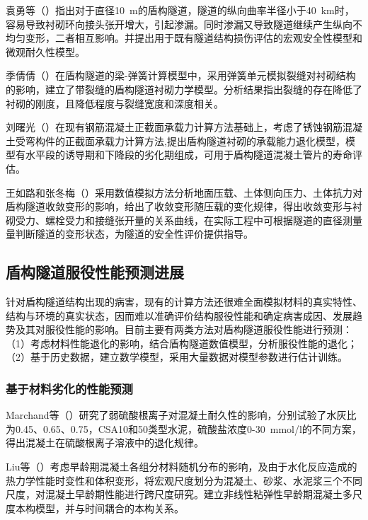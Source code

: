 袁勇等（\citeyear{袁勇2006运营越江隧道服役现状调查与检测评估}）指出对于直径10~m的盾构隧道，隧道的纵向曲率半径小于40~km时，容易导致衬砌环向接头张开增大，引起渗漏。同时渗漏又导致隧道继续产生纵向不均匀变形，二者相互影响。并提出用于既有隧道结构损伤评估的宏观安全性模型和微观耐久性模型。

季倩倩（\citeyear{季倩倩2009带裂缝的盾构隧道衬砌力学模型研究}）在盾构隧道的梁-弹簧计算模型中，采用弹簧单元模拟裂缝对衬砌结构的影响，建立了带裂缝的盾构隧道衬砌力学模型。分析结果指出裂缝的存在降低了衬砌的刚度，且降低程度与裂缝宽度和深度相关。

刘曙光（\citeyear{刘曙光2012盾构隧道混凝土管片的承载力退化模型}）在现有钢筋混凝土正截面承载力计算方法基础上，考虑了锈蚀钢筋混凝土受弯构件的正截面承载力计算方法,提出盾构隧道衬砌的承载能力退化模型，模型有水平段的诱导期和下降段的劣化期组成，可用于盾构隧道混凝土管片的寿命评估。

王如路和张冬梅（\citeyear{王如路2013超载作用下软土盾构隧道横向变形机理及控制指标研究}）采用数值模拟方法分析地面压载、土体侧向压力、土体抗力对盾构隧道收敛变形的影响，给出了收敛变形随压载的变化规律，得出收敛变形与衬砌受力、螺栓受力和接缝张开量的关系曲线，在实际工程中可根据隧道的直径测量量判断隧道的变形状态，为隧道的安全性评价提供指导。

\subsection{盾构隧道服役性能预测进展}

针对盾构隧道结构出现的病害，现有的计算方法还很难全面模拟材料的真实特性、结构与环境的真实状态，因而难以准确评价结构服役性能和确定病害成因、发展趋势及其对服役性能的影响。目前主要有两类方法对盾构隧道服役性能进行预测：（1）考虑材料性能退化的影响，结合盾构隧道数值模型，分析服役性能的退化；（2）基于历史数据，建立数学模型，采用大量数据对模型参数进行估计训练。

\subsubsection{基于材料劣化的性能预测}

Marchand等（\citeyear{Marchand2002Theoretical}）研究了弱硫酸根离子对混凝土耐久性的影响，分别试验了水灰比为0.45、0.65、0.75，CSA10和50类型水泥，硫酸盐浓度0-30~mmol/l的不同方案，得出混凝土在硫酸根离子溶液中的退化规律。

Liu等（\citeyear{Liu2014A}）考虑早龄期混凝土各组分材料随机分布的影响，及由于水化反应造成的热力学性能时变性和体积变形，将宏观尺度划分为混凝土、砂浆、水泥浆三个不同尺度，对混凝土早龄期性能进行跨尺度研究。建立非线性粘弹性早龄期混凝土多尺度本构模型，并与时间耦合的本构关系。

